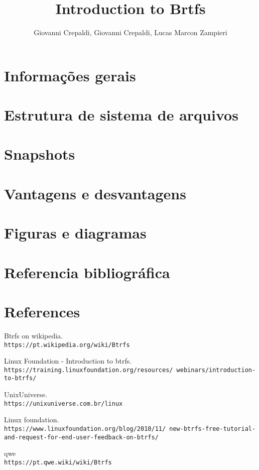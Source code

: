 \documentclass[12pt]{article}
\title{Introduction to Brtfs}
\author{Giovanni Crepaldi\inst{1}, Giovanni Crepaldi\inst{2}, Lucas Marcon Zampieri\inst{3}}
\begin{document}
\maketitle

\begin{abstract}

\end{abstract}

\begin{resumo}

\end{resumo}

\section{Informações gerais} \label{sec:firstpage}

\section{Estrutura de sistema de arquivos}

\section{Snapshots}

\section{Vantagens e desvantagens}

\section{Figuras e diagramas}\label{sec:figs}

\section{Referencia bibliográfica}

\section{References}

\begin{thebibliography}{9}
Btrfs on wikipedia.
\\\texttt{https://pt.wikipedia.org/wiki/Btrfs}

Linux Foundation - Introduction to btrfs.
\\\texttt{https://training.linuxfoundation.org/resources/\
webinars/introduction-to-btrfs/}

UnixUniverse.
\\\texttt{https://unixuniverse.com.br/linux}

Linux foundation.
\\\texttt{https://www.linuxfoundation.org/blog/2010/11/\
new-btrfs-free-tutorial-and-request-for-end-user-feedback-on-btrfs/}

\bibitem{qwe}
qwe
\\\texttt{https://pt.qwe.wiki/wiki/Btrfs}

\end{thebibliography}
\end{document}
